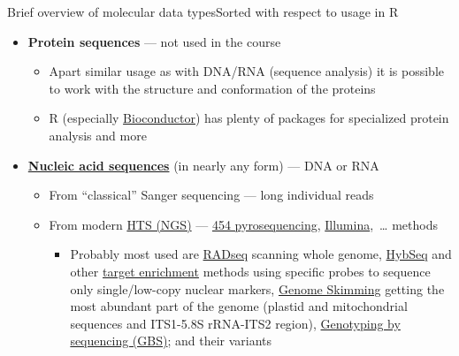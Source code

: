\documentclass[compress, ucs, xelatex, 11pt, xcolor=svgnames, aspectratio=169,
	hyperref={
		bookmarks=true,
		unicode=true,
		colorlinks=true,
		pdftitle={Molecular data in R},
		plainpages=false,
		pdfauthor={Vojtech Zeisek},
		pdfsubject={Course about phylogeny and evolution in R},
		pdfcreator={XeLaTeX},
		pdfkeywords={R, evolution, phylogeny, molecular data},
		linkcolor=Crimson, %
		anchorcolor=Magenta, %
		citecolor=Magenta, %
		filecolor=Magenta, %
		menucolor=Magenta, %
		urlcolor=DodgerBlue, %
		pdftex},
	url={hyphens, lowtilde} %
	]{beamer}
\begin{document}
\begin{frame}[allowframebreaks]{Brief overview of molecular data types}{Sorted with respect to usage in R}
\begin{itemize}
\begin{itemize}
			\begin{itemize}
				\item The allele \textbf{is} or \textbf{is not} present  --- it is impossible to distinguish heterozygots from dominant homozygots
				\item \href{https://en.wikipedia.org/wiki/Amplified_fragment_length_polymorphism}{AFLP} (Amplified Fragment Length Polymorphism) --- very variable, technically complicated, nowadays bit expensive and outdated
				\item Simpler methods \href{https://en.wikipedia.org/wiki/RAPD}{RAPD} (Random Amplified Polymorphic DNA) and \href{https://en.wikipedia.org/wiki/Restriction_fragment_length_polymorphism}{PCR-RFLP} (Polymerase Chain Reaction-Restriction Fragment Length Polymorphism) are not used anymore at all
			\end{itemize}
		\end{itemize}
		\item \textbf{Protein sequences} --- not used in the course
		\begin{itemize}
			\item Apart similar usage as with DNA/RNA (sequence analysis) it is possible to work with the structure and conformation of the proteins
			\item R (especially \href{https://bioconductor.org/}{Bioconductor}) has plenty of packages for specialized protein analysis and more
		\end{itemize}
		\item \textbf{\href{https://en.wikipedia.org/wiki/Nucleic_acid_sequence}{Nucleic acid sequences}} (in nearly any form) --- DNA or RNA
		\begin{itemize}
			\item From \enquote{classical} Sanger sequencing --- long individual reads
			\item From modern \href{https://en.wikipedia.org/wiki/DNA_sequencing\#High-throughput_methods}{HTS (NGS)} --- \href{https://en.wikipedia.org/wiki/Pyrosequencing}{454 pyrosequencing}, \href{https://en.wikipedia.org/wiki/Illumina_dye_sequencing}{Illumina},~\ldots{ }methods
			\begin{itemize}
				\item Probably most used are \href{https://en.wikipedia.org/wiki/Restriction_site_associated_DNA_markers}{RADseq} scanning whole genome, \href{https://bsapubs.onlinelibrary.wiley.com/doi/abs/10.3732/apps.1400042}{HybSeq} and other \href{https://en.wikipedia.org/wiki/Exome_sequencing}{target enrichment} methods using specific probes to sequence only single/low-copy nuclear markers, \href{https://bsapubs.onlinelibrary.wiley.com/doi/abs/10.3732/ajb.1100335}{Genome Skimming} getting the most abundant part of the genome (plastid and mitochondrial sequences and ITS1-5.8S rRNA-ITS2 region), \href{https://en.wikipedia.org/wiki/Genotyping_by_sequencing}{Genotyping by sequencing (GBS)}; and their variants

\end{itemize}
\end{itemize}
\end{itemize}
\end{frame}
\end{document}
